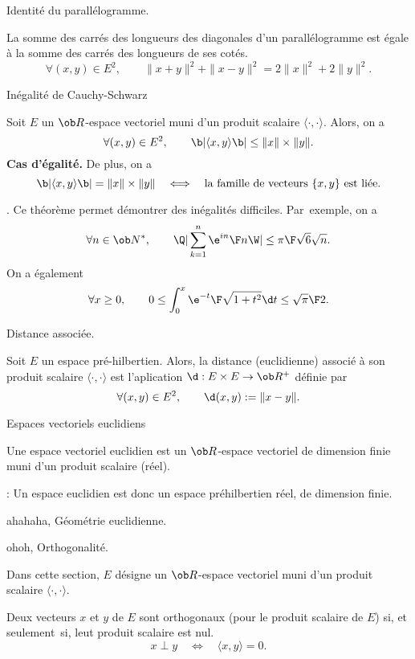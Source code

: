 \Concept [] Identit\'e du parall\'elogramme. 


\Propriete []  La somme des carr\'es des longueurs des diagonales d'un parall\'elogramme est \'egale \`a la somme des carr\'es des longueurs de ses cot\'es. 
$$
\forall (x,y)\in E^2, \qquad \|x+y\|^2+\|x-y\|^2=2\|x\|^2+2\|y\|^2.
$$

\Concept [] In\'egalit\'e de Cauchy-Schwarz

\Theoreme [Title=In\'egalit\'e de Cauchy-Schwarz]
Soit $E$ un $\ob R$-espace vectoriel 
muni d'un produit scalaire $\langle\cdot,\cdot\rangle$. Alors, on a 
$$
\forall (x,y)\in E^2, \qquad \b|\langle x,y\rangle\b|\le \|x\|\times\|y\|. 
$$
{\bf Cas d'\'egalit\'e. }De plus, on a 
$$
\b|\langle x,y\rangle\b|=\|x\|\times\|y\|\quad\Longleftrightarrow \quad \mbox{la famille de vecteurs }\{x,y\} \mbox{ est li\'ee}.
$$ 

\Remarque. Ce th\'eor\`eme permet d\'emontrer des in\'egalit\'es difficiles. 
Par~exemple, on a 
$$
\forall n\in\ob N^*, \qquad \Q|\sum_{k=1}^n{\e^{i n}\F n}\W|\le{\pi\F\sqrt6}\sqrt n. 
$$
On a \'egalement 
$$
\forall x\ge0, \qquad 0\le \int_0^x{\e^{-t}\F \sqrt{1+t^2}}\d t\le {\sqrt{\pi}\F 2}.
$$

\Concept [] Distance associ\'ee. 

\Definition []  Soit $E$ un espace pr\'e-hilbertien. Alors, la distance (euclidienne) associ\'e \`a son produit scalaire $\langle\cdot,\cdot\rangle$ est l'aplication $\d:E\times E\to\ob R^+$ d\'efinie par 
$$
\forall (x,y)\in E^2, \qquad \d(x,y):=\|x-y\|.
$$ 

\Concept [] Espaces vectoriels euclidiens

\Definition []  Une espace vectoriel euclidien est un $\ob R$-espace vectoriel de dimension finie muni d'un produit scalaire (r\'eel). 
\bigskip

\Remarque : Un espace euclidien est donc un espace pr\'ehilbertien r\'eel, de dimension finie. 
\bigskip

\Section ahahaha, G\'eom\'etrie euclidienne.

\Subsection ohoh, Orthogonalit\'e. 

\noindent
Dans cette section, $E$ d\'esigne un $\ob R$-espace vectoriel muni 
d'un produit scalaire $\langle\cdot,\cdot\rangle$. 
\bigskip

\Definition []  Deux vecteurs $x$ et $y$ de $E$ sont orthogonaux (pour le produit scalaire de $E$) 
si, et seulement~si, leut produit scalaire est nul. 
$$
x\perp y\quad\Longleftrightarrow\quad \langle x,y\rangle=0.
$$

